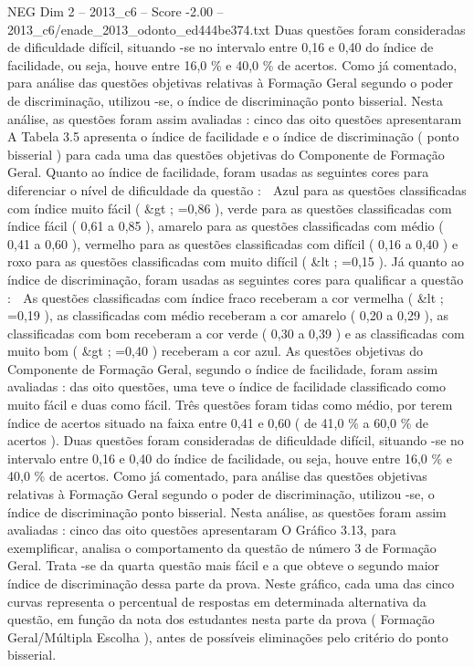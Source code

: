 \begin{textsample}{NEG Dim 2 – 2013\_c6 – Score -2.00 – 2013\_c6/enade\_2013\_odonto\_ed444be374.txt}
Duas questões foram consideradas de dificuldade difícil, situando -se no intervalo entre 0,16 e 0,40 do índice de facilidade, ou seja, houve entre 16,0 \% e 40,0 \% de acertos.
Como já comentado, para análise das questões objetivas relativas à Formação Geral segundo o poder de discriminação, utilizou -se, o índice de discriminação ponto bisserial.
Nesta análise, as questões foram assim avaliadas : cinco das oito questões apresentaram A Tabela 3.5 apresenta o índice de facilidade e o índice de discriminação ( ponto bisserial ) para cada uma das questões objetivas do Componente de Formação Geral.
Quanto ao índice de facilidade, foram usadas as seguintes cores para diferenciar o nível de dificuldade da questão :  Azul para as questões classificadas com índice muito fácil ( \&gt ; =0,86 ), verde para as questões classificadas com índice fácil ( 0,61 a 0,85 ), amarelo para as questões classificadas com médio ( 0,41 a 0,60 ), vermelho para as questões classificadas com difícil ( 0,16 a 0,40 ) e roxo para as questões classificadas com muito difícil ( \&lt ; =0,15 ).
Já quanto ao índice de discriminação, foram usadas as seguintes cores para qualificar a questão :  As questões classificadas com índice fraco receberam a cor vermelha ( \&lt ; =0,19 ), as classificadas com médio receberam a cor amarelo ( 0,20 a 0,29 ), as classificadas com bom receberam a cor verde ( 0,30 a 0,39 ) e as classificadas com muito bom ( \&gt ; =0,40 ) receberam a cor azul.
As questões objetivas do Componente de Formação Geral, segundo o índice de facilidade, foram assim avaliadas : das oito questões, uma teve o índice de facilidade classificado como muito fácil e duas como fácil.
Três questões foram tidas como médio, por terem índice de acertos situado na faixa entre 0,41 e 0,60 ( de 41,0 \% a 60,0 \% de acertos ).
Duas questões foram consideradas de dificuldade difícil, situando -se no intervalo entre 0,16 e 0,40 do índice de facilidade, ou seja, houve entre 16,0 \% e 40,0 \% de acertos.
Como já comentado, para análise das questões objetivas relativas à Formação Geral segundo o poder de discriminação, utilizou -se, o índice de discriminação ponto bisserial.
Nesta análise, as questões foram assim avaliadas : cinco das oito questões apresentaram O Gráfico 3.13, para exemplificar, analisa o comportamento da questão de número 3 de Formação Geral.
Trata -se da quarta questão mais fácil e a que obteve o segundo maior índice de discriminação dessa parte da prova.
Neste gráfico, cada uma das cinco curvas representa o percentual de respostas em determinada alternativa da questão, em função da nota dos estudantes nesta parte da prova ( Formação Geral/Múltipla Escolha ), antes de possíveis eliminações pelo critério do ponto bisserial.

\end{textsample}
